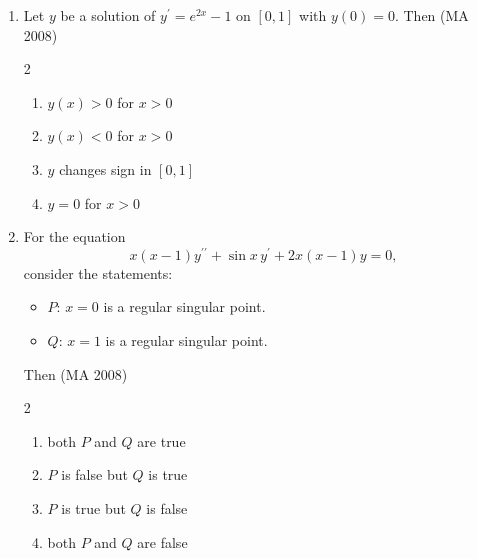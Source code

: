 \begin{enumerate}[label=\thesubsection.\arabic*,ref=\thesubsection.\theenumi]
\item Let \(y\) be a solution of \(y^{\prime} = e^{2x} - 1\) on \([0,1]\) with \(y(0) = 0\). Then
\hfill (MA 2008)
\begin{multicols}{2}
\begin{enumerate}
\item \(y(x) > 0\) for \(x > 0\)
\item \(y(x) < 0\) for \(x > 0\)
\item \(y\) changes sign in \([0,1]\)
\item \(y = 0\) for \(x > 0\)
\end{enumerate}
\end{multicols}
\item For the equation
\[
x(x-1) y^{\prime \prime} + \sin x\, y^{\prime} + 2 x(x-1) y = 0,
\]
consider the statements:
\begin{itemize}
  \item \(P\): \(x=0\) is a regular singular point.
  \item \(Q\): \(x=1\) is a regular singular point.
\end{itemize}
Then
\hfill (MA 2008)
\begin{multicols}{2}
\begin{enumerate}
\item both \(P\) and \(Q\) are true
\item \(P\) is false but \(Q\) is true
\item \(P\) is true but \(Q\) is false
\item both \(P\) and \(Q\) are false
\end{enumerate}
\end{multicols}
\end{enumerate}


